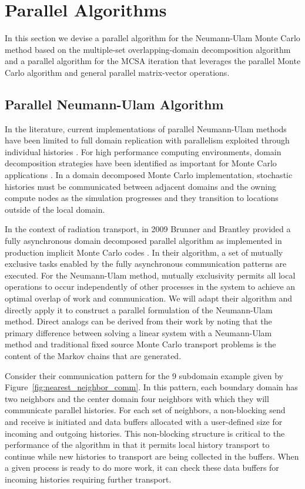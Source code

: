 \documentclass{snamc2013}
\begin{document}
\section{Parallel Algorithms}
In this section we devise a parallel algorithm for the Neumann-Ulam
Monte Carlo method based on the multiple-set overlapping-domain
decomposition algorithm and a parallel algorithm for the MCSA
iteration that leverages the parallel Monte Carlo algorithm and
general parallel matrix-vector operations.

\subsection{Parallel Neumann-Ulam Algorithm}
In the literature, current implementations of parallel Neumann-Ulam
methods have been limited to full domain replication with parallelism
exploited through individual histories
\cite{alexandrov_efficient_1998}. For high performance computing
environments, domain decomposition strategies have been identified as
important for Monte Carlo applications
\cite{brunner_comparison_2006,siegel_analysis_2012}. In a domain
decomposed Monte Carlo implementation, stochastic histories must be
communicated between adjacent domains and the owning compute nodes as
the simulation progresses and they transition to locations outside of
the local domain. 

In the context of radiation transport, in 2009 Brunner and Brantley
provided a fully asynchronous domain decomposed parallel algorithm as
implemented in production implicit Monte Carlo codes
\cite{brunner_efficient_2009}. In their algorithm, a set of mutually
exclusive tasks enabled by the fully asynchronous communication
patterns are executed. For the Neumann-Ulam method, mutually
exclusivity permits all local operations to occur independently of
other processes in the system to achieve an optimal overlap of work
and communication. We will adapt their algorithm and directly apply it
to construct a parallel formulation of the Neumann-Ulam method. Direct
analogs can be derived from their work by noting that the primary
difference between solving a linear system with a Neumann-Ulam method
and traditional fixed source Monte Carlo transport problems is the
content of the Markov chains that are generated.

Consider their communication pattern for the 9 subdomain example given
by Figure~\ref{fig:nearest_neighbor_comm}. In this pattern, each
boundary domain has two neighbors and the center domain four neighbors
with which they will communicate parallel histories. For each set of
neighbors, a non-blocking send and receive is initiated and data
buffers allocated with a user-defined size for incoming and outgoing
histories. This non-blocking structure is critical to the performance
of the algorithm in that it permits local history transport to
continue while new histories to transport are being collected in the
buffers. When a given process is ready to do more work, it can check
these data buffers for incoming histories requiring further
transport.
\end{document}
